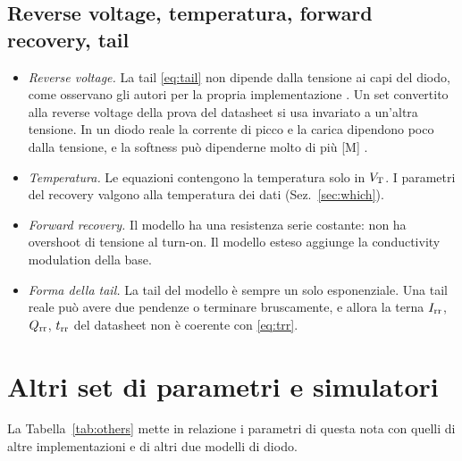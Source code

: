 \documentclass[10pt,a4paper]{scrartcl}
\let\newcommand\lmitdefine
\newcommand{\Irr}{I_\mathrm{rr}}
\newcommand{\Qrr}{Q_\mathrm{rr}}
\newcommand{\trr}{t_\mathrm{rr}}
\newcommand{\VT}{V_\mathrm{T}}
\begin{document}
\subsection{Reverse voltage, temperatura, forward recovery, tail}
\begin{itemize}
\item \emph{Reverse voltage.} La tail \eqref{eq:tail} non dipende dalla tensione ai capi del diodo, come osservano gli autori per la propria implementazione \cite{pemodels}. Un set convertito alla reverse voltage della prova del datasheet si usa invariato a un'altra tensione. In un diodo reale la corrente di picco e la carica dipendono poco dalla tensione, e la softness può dipenderne molto di più [M] \cite{lutz}.
\item \emph{Temperatura.} Le equazioni contengono la temperatura solo in $\VT$. I parametri del recovery valgono alla temperatura dei dati (Sez.~\ref{sec:which}).
\item \emph{Forward recovery.} Il modello ha una resistenza serie costante: non ha overshoot di tensione al turn-on. Il modello esteso \cite{ma1993} aggiunge la conductivity modulation della base.
\item \emph{Forma della tail.} La tail del modello è sempre un solo esponenziale. Una tail reale può avere due pendenze o terminare bruscamente, e allora la terna $\Irr$, $\Qrr$, $\trr$ del datasheet non è coerente con \eqref{eq:trr}.
\end{itemize}

\section{Altri set di parametri e simulatori}
\label{sec:others}
La Tabella~\ref{tab:others} mette in relazione i parametri di questa nota con quelli di altre implementazioni e di altri due modelli di diodo.
\end{document}
